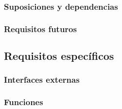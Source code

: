 \documentclass{article}
\begin{document}


        \subsubsection{Suposiciones y dependencias}





        \subsubsection{Requisitos futuros}





    \subsection{Requisitos específicos}





        \subsubsection{Interfaces externas}





        \subsubsection{Funciones}
\end{document}
